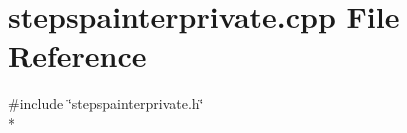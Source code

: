 \section{stepspainterprivate.\+cpp File Reference}
\label{curve_2painters_2stepspainterprivate_8cpp}
{\ttfamily \#include \char`\"{}stepspainterprivate.\+h\char`\"{}}\\*
